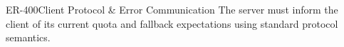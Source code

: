 \begin{equipmentrequirement}{ER-400}{Client Protocol \& Error Communication}
    The server must inform the client of its current quota and fallback expectations using standard protocol semantics.
\end{equipmentrequirement}
